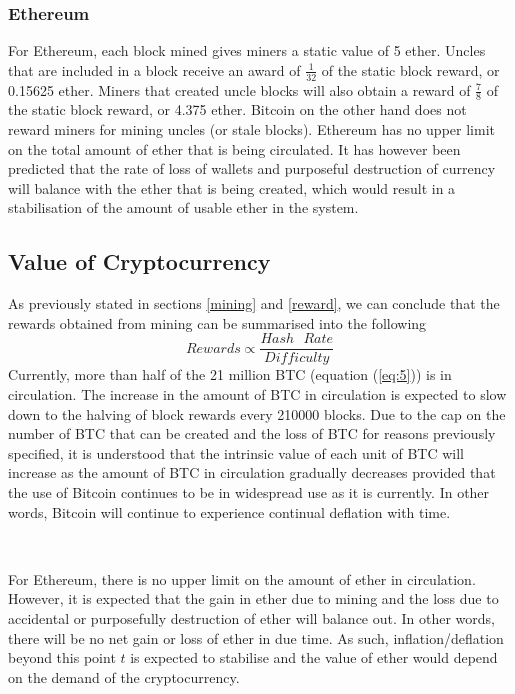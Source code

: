 \documentclass[a4paper,12pt]{article}
\begin{document}
{{\subsubsection{Ethereum}
For Ethereum, each block mined gives miners a static value of 5 ether. Uncles that are included in a block receive an award of $\frac{1}{32}$ of the static block reward, or 0.15625 ether. Miners that created uncle blocks will also obtain a reward of $\frac{7}{8}$ of the static block reward, or 4.375 ether. Bitcoin on the other hand does not reward miners for mining uncles (or stale blocks). Ethereum has no upper limit on the total amount of ether that is being circulated. It has however been predicted that the rate of loss of wallets and purposeful destruction of currency will balance with the ether that is being created, which would result in a stabilisation of the amount of usable ether in the system.
\subsection{Value of Cryptocurrency}
{\par As previously stated in sections \ref{mining} and \ref{reward}, we can conclude that the rewards obtained from mining can be summarised into the following
	\begin{equation*}
	Rewards \propto \frac{Hash\text{ }Rate}{Difficulty}
	\end{equation*}
	Currently, more than half of the 21 million BTC (equation (\ref{eq:5})) is in circulation. The increase in the amount of BTC in circulation is expected to slow down to the halving of block rewards every 210000 blocks. Due to the cap on the number of BTC that can be created and the loss of BTC for reasons previously specified, it is understood that the intrinsic value of each unit of BTC will increase as the amount of BTC in circulation gradually decreases provided that the use of Bitcoin continues to be in widespread use as it is currently. In other words, Bitcoin will continue to experience continual deflation with time.}\\
{\par \noindent For Ethereum, there is no upper limit on the amount of ether in circulation. However, it is expected that the gain in ether due to mining and the loss due to accidental or purposefully destruction of ether will balance out. In other words, there will be no net gain or loss of ether in due time. As such, inflation/deflation beyond this point $t$ is expected to stabilise and the value of ether would depend on the demand of the cryptocurrency.}
}}
\end{document}
